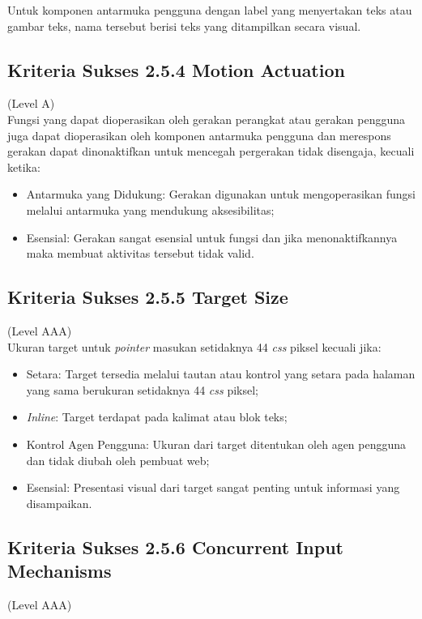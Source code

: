 Untuk komponen antarmuka pengguna dengan label yang menyertakan teks atau gambar teks, nama tersebut berisi teks yang ditampilkan secara visual.

\subsection{Kriteria Sukses 2.5.4 Motion Actuation}
\label{subsec:kriteria_2.5.4}
(Level A) \\

Fungsi yang dapat dioperasikan oleh gerakan perangkat atau gerakan pengguna juga dapat dioperasikan oleh komponen antarmuka pengguna dan merespons gerakan dapat dinonaktifkan untuk mencegah pergerakan tidak disengaja, kecuali ketika:

\begin{itemize}
	\item Antarmuka yang Didukung: Gerakan digunakan untuk mengoperasikan fungsi melalui antarmuka yang mendukung aksesibilitas;
	\item Esensial: Gerakan sangat esensial untuk fungsi dan jika menonaktifkannya maka membuat aktivitas tersebut tidak valid.
\end{itemize}

\subsection{Kriteria Sukses 2.5.5 Target Size}
\label{subsec:kriteria_2.5.5}
(Level AAA) \\

Ukuran target untuk \textit{pointer} masukan setidaknya 44 \textit{css} piksel kecuali jika:

\begin{itemize}
	\item Setara: Target tersedia melalui tautan atau kontrol yang setara pada halaman yang sama berukuran setidaknya 44 \textit{css} piksel;
	\item \textit{Inline}: Target terdapat pada kalimat atau blok teks;
	\item Kontrol Agen Pengguna: Ukuran dari target ditentukan oleh agen pengguna dan tidak diubah oleh pembuat web;
	\item Esensial: Presentasi visual dari target sangat penting untuk informasi yang disampaikan.
\end{itemize}

\subsection{Kriteria Sukses 2.5.6 Concurrent Input Mechanisms}
\label{subsec:kriteria_2.5.6}
(Level AAA) \\

